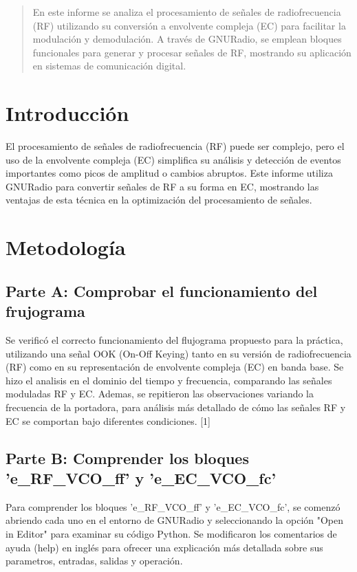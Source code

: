 \documentclass{journal}[IEEEtran, twocolumn]             %
\begin{document}
\begin{multicols}{2}

\begin{abstract}
    En este informe se analiza el procesamiento de señales de radiofrecuencia (RF) utilizando su conversión a envolvente compleja (EC) para facilitar la modulación y demodulación. A través de GNURadio, se emplean bloques funcionales para generar y procesar señales de RF, mostrando su aplicación en sistemas de comunicación digital.
    
\end{abstract}

\section{Introducción}
  El procesamiento de señales de radiofrecuencia (RF) puede ser complejo, pero el uso de la envolvente compleja (EC) simplifica su análisis y detección de eventos importantes como picos de amplitud o cambios abruptos. Este informe utiliza GNURadio para convertir señales de RF a su forma en EC, mostrando las ventajas de esta técnica en la optimización del procesamiento de señales.


\section{Metodología}

\subsection{Parte A: Comprobar el funcionamiento del frujograma}
Se verificó el correcto funcionamiento del flujograma propuesto para la práctica, utilizando una señal OOK (On-Off Keying) tanto en su versión de radiofrecuencia (RF) como en su representación de envolvente compleja (EC) en banda base. Se hizo el analisis en el dominio del tiempo y frecuencia, comparando las señales moduladas RF y EC. Ademas, se repitieron las observaciones variando la frecuencia de la portadora, para análisis más detallado de cómo las señales RF y EC se comportan bajo diferentes condiciones. [1]


\subsection{Parte B: Comprender los bloques 'e\_RF\_VCO\_ff' y 'e\_EC\_VCO\_fc'}
Para comprender los bloques 'e\_RF\_VCO\_ff' y 'e\_EC\_VCO\_fc', se comenzó abriendo cada uno en el entorno de GNURadio y seleccionando la opción "Open in Editor" para examinar su código Python. Se modificaron los comentarios de ayuda (help) en inglés para ofrecer una explicación más detallada sobre sus parametros, entradas, salidas y operación.


\end{multicols}
\end{document}
